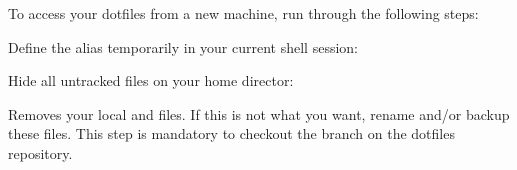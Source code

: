 \begin{flushleft}
	To access your dotfiles from a new machine, run through the following steps:
\end{flushleft}

\begin{flushleft}
\end{flushleft}
\vspace{-0.6cm}
\begin{flushleft}
\end{flushleft}

\begin{flushleft}
	Define the  alias temporarily in your current shell session:
\end{flushleft}

\begin{flushleft}
	\hbox{}
\end{flushleft}

\begin{flushleft}
	Hide all untracked files on your home director:
\end{flushleft}

\begin{flushleft}
\end{flushleft}

\begin{flushleft}
	Removes	your local  and  files.
	If this is not what you want, rename and/or backup these files. This step is
	mandatory to checkout the branch on the dotfiles repository.
\end{flushleft}

\begin{flushleft}
\end{flushleft}
\vspace{-0.6cm}
\begin{flushleft}
\end{flushleft}
\vspace{-0.6cm}
\begin{flushleft}
\end{flushleft}
